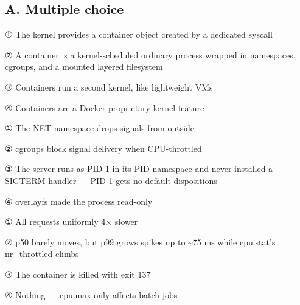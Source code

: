 

\subsection*{A. Multiple choice}


\begin{tbboptions}
  \item ① The kernel provides a container object created by a dedicated syscall
  \item ② A container is a kernel-scheduled ordinary process wrapped in namespaces, cgroups, and a mounted layered filesystem
  \item ③ Containers run a second kernel, like lightweight VMs
  \item ④ Containers are a Docker-proprietary kernel feature
\end{tbboptions}


\begin{tbboptions}
  \item ① The NET namespace drops signals from outside
  \item ② cgroups block signal delivery when CPU-throttled
  \item ③ The server runs as PID 1 in its PID namespace and never installed a SIGTERM handler — PID 1 gets no default dispositions
  \item ④ overlayfs made the process read-only
\end{tbboptions}


\begin{tbboptions}
  \item ① All requests uniformly 4× slower
  \item ② p50 barely moves, but p99 grows spikes up to \textasciitilde{}75 ms while cpu.stat's nr\_throttled climbs
  \item ③ The container is killed with exit 137
  \item ④ Nothing — cpu.max only affects batch jobs
\end{tbboptions}

